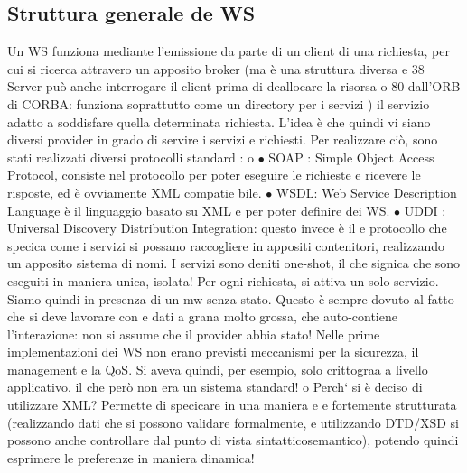 \subsection{Struttura generale de WS}
Un WS funziona mediante l'emissione da parte di un client di una richiesta,
per cui si ricerca attravero un apposito broker (ma è una struttura diversa
e
38 Server
può anche interrogare il client prima di deallocare la risorsa
o
80
dall'ORB di CORBA: funziona soprattutto come un directory per i servizi ) il
servizio adatto a soddisfare quella determinata richiesta.
L'idea è che quindi vi siano diversi provider in grado di servire i servizi
e
richiesti. Per realizzare ciò, sono stati realizzati diversi protocolli standard :
o
$\bullet$ SOAP : Simple Object Access Protocol, consiste nel protocollo per poter
eseguire le richieste e ricevere le risposte, ed è ovviamente XML compatie
bile.
$\bullet$ WSDL: Web Service Description Language è il linguaggio basato su XML
e
per poter definire dei WS.
$\bullet$ UDDI : Universal Discovery Distribution Integration: questo invece è il
e
protocollo che specica come i servizi si possano raccogliere in appositi
contenitori, realizzando un apposito sistema di nomi.
I servizi sono deniti one-shot, il che signica che sono eseguiti in maniera unica,
isolata! Per ogni richiesta, si attiva un solo servizio. Siamo quindi in presenza
di un mw senza stato. Questo è sempre dovuto al fatto che si deve lavorare con
e
dati a grana molto grossa, che auto-contiene l'interazione: non si assume che il
provider abbia stato!
Nelle prime implementazioni dei WS non erano previsti meccanismi per la
sicurezza, il management e la QoS. Si aveva quindi, per esempio, solo crittograa
a livello applicativo, il che però non era un sistema standard!
o
Perch` si è deciso di utilizzare XML? Permette di specicare in una maniera
e e
fortemente strutturata (realizzando dati che si possono validare formalmente, e
utilizzando DTD/XSD si possono anche controllare dal punto di vista sintatticosemantico), potendo quindi esprimere le
preferenze in maniera dinamica!
